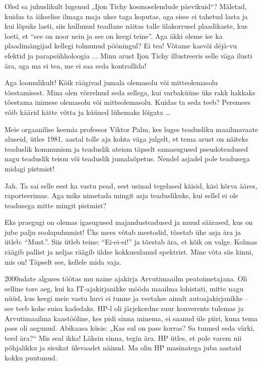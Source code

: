 Oled sa juhuslikult lugenud „Ijon Tichy kosmoselendude 
päevikuid“? Mäletad, 
kuidas ta äikselise ilmaga maja ukse taga koputas, aga sisse ei tahetud lasta ja kui 
lõpuks lasti, siis hullunud teadlane näitas talle ülakorrusel 
plaadikaste, kus loeti, et \enquote{see on noor neiu ja see on keegi teine}. 
Aga äkki oleme ise ka plaadimängijad kellegi tolmunud pööningul? Ei tea! Võtame kasvõi
déjà-vu efektid ja parapsühholoogia ... Minu arust Ijon Tichy illustreeris selle väga ilusti 
ära, aga ma ei tea, me ei saa seda kontrollida! 


Aga loomulikult! Kõik räägivad jumala olemasolu või
mitteolemasolu tõestamisest. Mina olen võrrelnud seda sellega, kui varbaküüne 
üks rakk hakkaks tõestama inimese olemasolu või mitteolemasolu. Kuidas ta seda 
teeb? Peremees võib käärid kätte võtta ja küüned lühemaks lõigata \ldots

Meie orgaanilise keemia professor Viktor Palm, kes
luges teadusliku maailmavaate aluseid, ütles 1981. aastal tolle aja kohta väga julgelt, et tema arust on näiteks teaduslik kommunism ja teaduslik 
ateism täpselt samasugused pseudoteadused nagu teaduslik teism või teaduslik 
jumalaõpetus. Nendel asjadel pole teadusega midagi pistmist!


Jah. Ta sai selle eest ka vastu pead, sest usinad tegelased käisid, käsi kõrva ääres, raporteerimas. Aga miks nimetada mingit asja 
teaduslikuks, kui sellel ei ole teadusega mitte mingit pistmist?


Eks praegugi on olemas igasugused majandusteadused ja muud säärased, kus on
jube palju soolapuhumist! Üks mees võtab meetodid, tõestab ühe 
asja ära ja ütleb: \enquote{Must.}. Siis ütleb teine: \enquote{Ei-ei-ei!} ja tõestab 
ära, et kõik on valge. Kolmas räägib pallist ja neljas räägib üldse kokkusulanud spektrist. Mine võta siis kinni, mis on! Täpselt see, kellele mida vaja.


2000ndate alguses töötas mu naine ajakirja 
Arvutimaailm peatoimetajana. Oli selline tore aeg, kui 
ka IT-ajakirjanikke mööda maailma lohistati, mitte nagu nüüd, kus keegi meie 
vastu huvi ei tunne ja veetakse ainult autoajakirjanikke -- see teeb kohe suisa 
kadedaks. HP-l oli järjekordne suur konverents tulemas ja 
Arvutimaailma kaastööline, kes pidi sinna minema, ei saanud üle piiri, kuna tema pass oli aegunud. Abikaasa küsis: „Kas sul on pass korras? Sa tunned 
seda värki, teed ära?“ Mis seal ikka! Läksin sinna, tegin ära. HP ütles, et pole varem nii
põhjalikku ja sisukat ülevaadet näinud. Ma olin HP masinatega 
juba aastaid kokku puutunud. 

